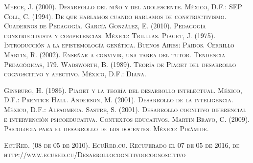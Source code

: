 \documentclass{bmcart}
\begin{document}


\newpage
\renewcommand{\refname}{Referencias}\begin{thebibliography}{X}
 \textsc{Meece, J. (2000). Desarrollo del niño y del adolescente. México, D.F.: SEP}
 \textsc{Coll, C. (1994). De que hablamos cuando hablamos de constructivismo. Cuadernos de Pedagogía.}
 \textsc{García González, E. (2010). Pedagogía constructivista y competencias. México: Trilllas.}
 \textsc{Piaget, J. (1975). Introducción a la epistemología genética. Buenos Aires: Paidos.}
 \textsc{Cerrillo Martin, R. (2002). Enseñar a convivir, una tarea del tutor. Tendencia Pedagógicas, 179.}
 \textsc{Wadsworth, B. (1989). Teoría de Piaget del desarrollo cognoscitivo y afectivo. México, D.F.: Diana.}

 \textsc{Ginsburg, H. (1986). Piaget y la teoría del desarrollo intelectual. México, D.F.: Prentice Hall.
}
 \textsc{Anderson, M. (2001). Desarrollo de la inteligencia. México, D.F.: Alfaomega.}
 \textsc{Sastre, S. (2001). Desarrollo cognitivo diferencial e intervenciòn psicoeducativa. Contextos educativos.}
 \textsc{Martin Bravo, C. (2009). Psicologìa para el desarrollo de los docentes. Mèxico: Piràmide.
}

 \textsc{EcuRed. (08 de 05 de 2010). EcuRed.cu. Recuperado el 07 de 05 de 2016, de http://www.ecured.cu/Desarrollocognitivoocognoscitivo
}
\end{thebibliography}





\end{document}
